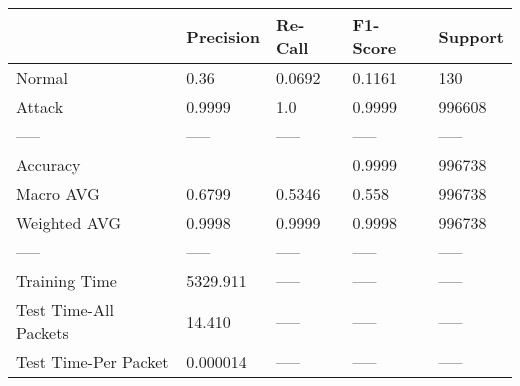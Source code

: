 \begin{tabular}{lllll}
\toprule
{} & Precision & Re-Call & F1-Score & Support \\
\midrule
Normal                &      0.36 &  0.0692 &   0.1161 &     130 \\
Attack                &    0.9999 &     1.0 &   0.9999 &  996608 \\
-----                 &     ----- &   ----- &    ----- &   ----- \\
Accuracy              &           &         &   0.9999 &  996738 \\
Macro AVG             &    0.6799 &  0.5346 &    0.558 &  996738 \\
Weighted AVG          &    0.9998 &  0.9999 &   0.9998 &  996738 \\
-----                 &     ----- &   ----- &    ----- &   ----- \\
Training Time         &  5329.911 &   ----- &    ----- &   ----- \\
Test Time-All Packets &    14.410 &   ----- &    ----- &   ----- \\
Test Time-Per Packet  &  0.000014 &   ----- &    ----- &   ----- \\
\bottomrule
\end{tabular}
